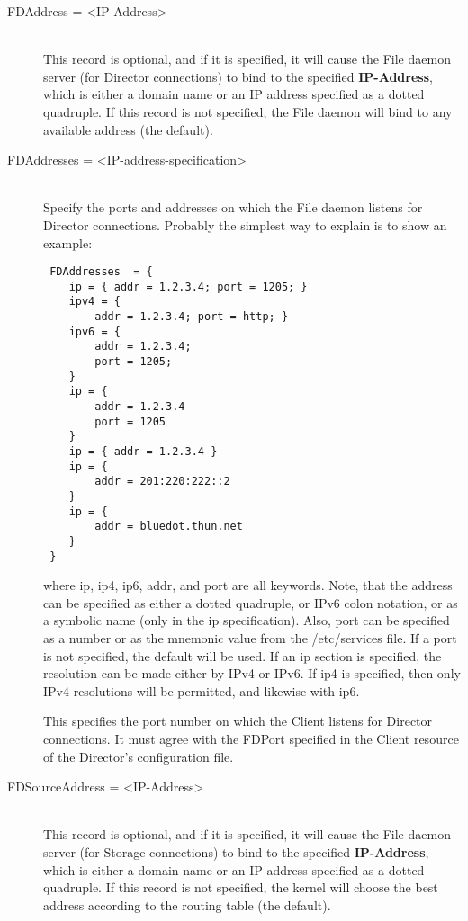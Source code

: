 \begin{description}
\item [FDAddress = {\textless}IP-Address{\textgreater}] \hfill \\
This record is optional,  and if it is specified, it will cause the File
daemon server (for  Director connections) to bind to the specified {\bf
IP-Address},  which is either a domain name or an IP address specified as a
dotted quadruple. If this record is not specified, the File daemon  will bind
to any available address (the default).


\item [FDAddresses = {\textless}IP-address-specification{\textgreater}] \hfill \\
Specify the ports and addresses on which the File daemon listens for
Director connections.  Probably the simplest way to explain is to show
an example:

\footnotesize
\begin{verbatim}
 FDAddresses  = {
    ip = { addr = 1.2.3.4; port = 1205; }
    ipv4 = {
        addr = 1.2.3.4; port = http; }
    ipv6 = {
        addr = 1.2.3.4;
        port = 1205;
    }
    ip = {
        addr = 1.2.3.4
        port = 1205
    }
    ip = { addr = 1.2.3.4 }
    ip = {
        addr = 201:220:222::2
    }
    ip = {
        addr = bluedot.thun.net
    }
 }
\end{verbatim}
\normalsize

where ip, ip4, ip6, addr, and port are all keywords. Note, that  the address
can be specified as either a dotted quadruple, or  IPv6 colon notation, or as
a symbolic name (only in the ip specification).  Also, port can be specified
as a number or as the mnemonic value from  the /etc/services file.  If a port
is not specified, the default will be used. If an ip  section is specified,
the resolution can be made either by IPv4 or  IPv6. If ip4 is specified, then
only IPv4 resolutions will be permitted,  and likewise with ip6.

This specifies the port number  on which the Client listens for Director
connections. It must agree  with the FDPort specified in the Client resource
of the Director's  configuration file.


\item [FDSourceAddress = {\textless}IP-Address{\textgreater}] \hfill \\
This record is optional,  and if it is specified, it will cause the File
daemon server (for  Storage connections) to bind to the specified {\bf
IP-Address},  which is either a domain name or an IP address specified as a
dotted quadruple. If this record is not specified, the kernel will choose
the best address according to the routing table (the default).


\end{description}
